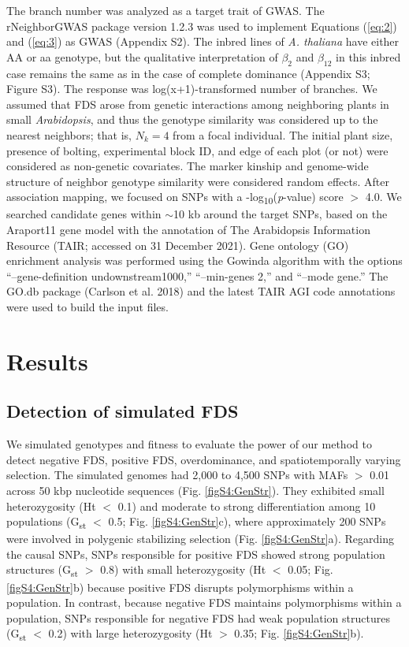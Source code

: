 \documentclass[12pt,]{article}
\begin{document}
The branch number was analyzed as a target trait of GWAS. The rNeighborGWAS package version 1.2.3 \citep{sato2019neighbor} was used to implement Equations (\ref{eq:2}) and (\ref{eq:3}) as GWAS (Appendix S2). The inbred lines of \textit{A. thaliana} have either AA or aa genotype, but the qualitative interpretation of $\beta_2$ and $\beta_{12}$ in this inbred case remains the same as in the case of complete dominance (Appendix S3; Figure S3). The response was log(x+1)-transformed number of branches. We assumed that FDS arose from genetic interactions among neighboring plants in small \textit{Arabidopsis}, and thus the genotype similarity was considered up to the nearest neighbors; that is, $N_k=4$ from a focal individual. The initial plant size, presence of bolting, experimental block ID, and edge of each plot (or not) were considered as non-genetic covariates. The marker kinship and genome-wide structure of neighbor genotype similarity were considered random effects. After association mapping, we focused on SNPs with a -log\textsubscript{10}(\textit{p}-value) score $>$ 4.0. We searched candidate genes within $\sim$10 kb around the target SNPs, based on the Araport11 gene model with the annotation of The Arabidopsis Information Resource (TAIR; accessed on 31 December 2021). Gene ontology (GO) enrichment analysis was performed using the Gowinda algorithm \citep{kofler2012gowinda} with the options “--gene-definition undownstream1000,” “--min-genes 2,” and “--mode gene.” The GO.db package (Carlson et al. 2018) and the latest TAIR AGI code annotations were used to build the input files.


\section{Results}

\subsection{Detection of simulated FDS}
We simulated genotypes and fitness to evaluate the power of our method to detect negative FDS, positive FDS, overdominance, and spatiotemporally varying selection. The simulated genomes had 2,000 to 4,500 SNPs with MAFs $>$ 0.01 across 50 kbp nucleotide sequences (Fig. \ref{figS4:GenStr}). They exhibited small heterozygosity (Ht $<$ 0.1) and moderate to strong differentiation among 10 populations (G\textsubscript{st} $<$ 0.5; Fig. \ref{figS4:GenStr}c), where approximately 200 SNPs were involved in polygenic stabilizing selection (Fig. \ref{figS4:GenStr}a). Regarding the causal SNPs, SNPs responsible for positive FDS showed strong population structures (G\textsubscript{st} $>$ 0.8) with small heterozygosity (Ht $<$ 0.05; Fig. \ref{figS4:GenStr}b) because positive FDS disrupts polymorphisms within a population. In contrast, because negative FDS maintains polymorphisms within a population, SNPs responsible for negative FDS had weak population structures (G\textsubscript{st} $<$ 0.2) with large heterozygosity (Ht $>$ 0.35; Fig. \ref{figS4:GenStr}b).
\end{document}

